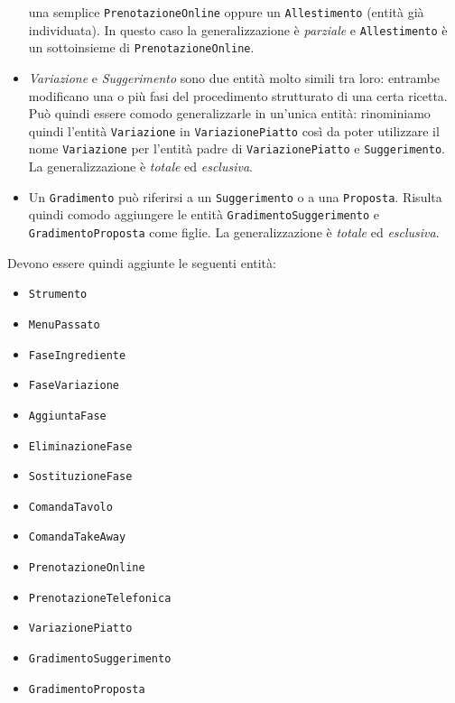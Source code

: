 \begin{itemize}
    una semplice {\tt PrenotazioneOnline} oppure un {\tt Allestimento} (entità già individuata).
    In questo caso la generalizzazione è {\it parziale} e {\tt Allestimento}
    è un sottoinsieme di {\tt PrenotazioneOnline}.
\item {\it Variazione} e {\it Suggerimento} sono due entità molto simili tra loro: entrambe
    modificano una o più fasi del procedimento strutturato di una certa ricetta. Può quindi
    essere comodo generalizzarle in un'unica entità: rinominiamo quindi l'entità {\tt Variazione}
    in {\tt VariazionePiatto} così da poter utilizzare il nome {\tt Variazione} per l'entità
    padre di {\tt VariazionePiatto} e {\tt Suggerimento}. La generalizzazione è {\it totale}
    ed {\it esclusiva}.
\item Un {\tt Gradimento} può riferirsi a un {\tt Suggerimento} o a una {\tt Proposta}.
    Risulta quindi comodo aggiungere le entità {\tt GradimentoSuggerimento} e
    {\tt GradimentoProposta} come figlie. La generalizzazione è {\it totale} ed
    {\it esclusiva}.
\end{itemize}

Devono essere quindi aggiunte le seguenti entità:
\begin{multicols}{2}
\begin{itemize}
    \item\tt Strumento
    \item\tt MenuPassato
    \item\tt FaseIngrediente
    \item\tt FaseVariazione
    \item\tt AggiuntaFase
    \item\tt EliminazioneFase
    \item\tt SostituzioneFase
    \item\tt ComandaTavolo
    \item\tt ComandaTakeAway
    \item\tt PrenotazioneOnline
    \item\tt PrenotazioneTelefonica
    \item\tt VariazionePiatto
    \item\tt GradimentoSuggerimento
    \item\tt GradimentoProposta
\end{itemize}
\end{multicols}
